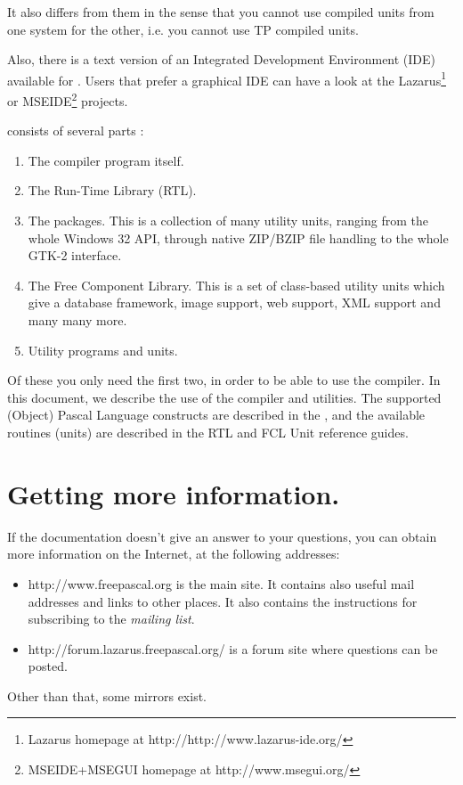 It also differs from them in the sense that you cannot use compiled units
from one system for the other, i.e. you cannot use TP compiled units.

Also, there is a text version of an Integrated Development Environment (IDE)
available for \fpc. Users that prefer a graphical IDE can have a look at the
Lazarus\footnote{Lazarus homepage at http://http://www.lazarus-ide.org/ }
or MSEIDE\footnote{MSEIDE+MSEGUI homepage at http://www.msegui.org/ } projects.

\fpc consists of several parts :
\begin{enumerate}
\item The compiler program itself.
\item The Run-Time Library (RTL).
\item The packages. This is a collection of many utility units, ranging from
the whole Windows 32 API, through native ZIP/BZIP file handling to the whole GTK-2 interface.
\item The Free Component Library. This is a set of class-based utility units which give
a database framework, image support, web support, XML support and many many more.
\item Utility programs and units.
\end{enumerate}

Of these you only need the first two, in order to be able to use the compiler.
In this document, we describe the use of the compiler and utilities.
The supported (Object) Pascal Language constructs are described in the ,
and the available routines (units) are described in the RTL and FCL Unit reference guides.

\section{Getting more information.}
If the documentation doesn't give an answer to your questions,
you can obtain more information on the Internet, at the following addresses:
\begin{itemize}
\item
{}
{http://www.freepascal.org} is the main
site. It contains also useful mail addresses and
links to other places.
It also contains the instructions for subscribing to the
\textit{mailing list}.

\item
{}
{http://forum.lazarus.freepascal.org/} is a forum site where
questions can be posted.
\end{itemize}
Other than that, some mirrors exist.

